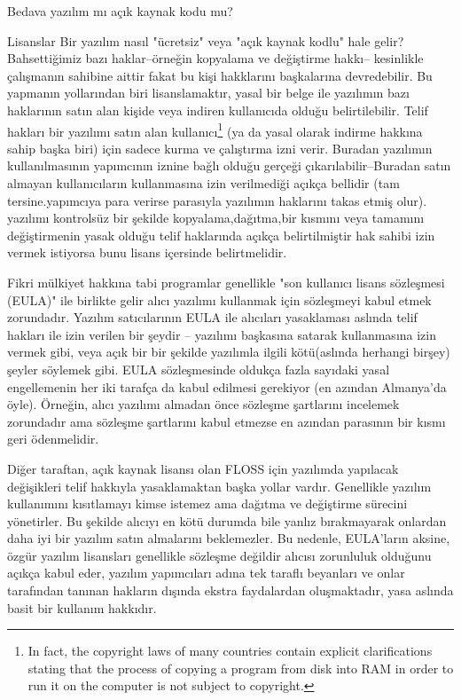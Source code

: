 \begin{section}{Bedava yazılım mı açık kaynak kodu mu?}
\begin{subsection}{Lisanslar}
Bir yazılım nasıl  "ücretsiz" veya "açık kaynak kodlu" hale gelir?  Bahsettiğimiz bazı haklar--örneğin kopyalama ve değiştirme hakkı-- kesinlikle çalışmanın sahibine aittir fakat bu kişi hakklarını başkalarına devredebilir. Bu yapmanın  yollarından biri lisanslamaktır, yasal bir belge ile yazılımın bazı haklarının satın alan kişide veya indiren kullanıcıda olduğu belirtilebilir. Telif hakları bir yazılımı satın alan kullanıcı\footnote{In fact, the copyright laws of many countries contain explicit clarifications stating that the process of copying a program from disk into RAM in order to run it on the computer is not subject to copyright.} (ya da yasal olarak indirme hakkına sahip başka biri) için sadece kurma ve çalıştırma izni verir. Buradan yazılımın kullanılmasının yapımcının iznine bağlı olduğu gerçeği çıkarılabilir--Buradan satın almayan kullanıcıların kullanmasına izin verilmediği açıkça bellidir (tam tersine.yapımcıya para verirse parasıyla yazılımın haklarını takas etmiş olur). yazılımı kontrolsüz bir şekilde  kopyalama,dağıtma,bir kısmını veya tamamını değiştirmenin yasak olduğu telif haklarında açıkça belirtilmiştir hak sahibi izin vermek istiyorsa bunu lisans içersinde belirtmelidir.

Fikri mülkiyet hakkına tabi programlar genellikle "son kullanıcı lisans sözleşmesi (EULA)" ile birlikte gelir alıcı yazılımı kullanmak için  sözleşmeyi kabul etmek zorundadır. Yazılım satıcılarının EULA ile  alıcıları yasaklaması aslında telif hakları ile izin verilen bir şeydir -- yazılımı başkasına  satarak kullanmasına izin vermek gibi, veya açık bir bir şekilde yazılımla ilgili kötü(aslında herhangi birşey) şeyler söylemek gibi. EULA  sözleşmesinde oldukça fazla sayıdaki yasal engellemenin her iki tarafça da kabul edilmesi gerekiyor (en azından Almanya'da öyle). Örneğin, alıcı yazılımı almadan önce sözleşme şartlarını incelemek zorundadır ama sözleşme şartlarını kabul etmezse en azından parasının bir kısmı geri ödenmelidir.

Diğer taraftan, açık kaynak lisansı olan FLOSS için yazılımda yapılacak değişikleri telif hakkıyla yasaklamaktan başka yollar vardır. Genellikle yazılım kullanımını kısıtlamayı kimse istemez ama dağıtma ve değiştirme sürecini yönetirler. Bu şekilde alıcıyı en kötü durumda bile yanlız bırakmayarak onlardan daha iyi bir yazılım satın almalarını beklemezler. Bu nedenle, EULA'ların aksine, özgür yazılım lisansları genellikle sözleşme değildir alıcısı zorunluluk olduğunu açıkça kabul eder, yazılım yapımcıları adına tek taraflı beyanları ve onlar tarafından tanınan hakların dışında ekstra faydalardan oluşmaktadır, yasa aslında basit bir kullanım hakkıdır.


\end{subsection}
\end{section}
